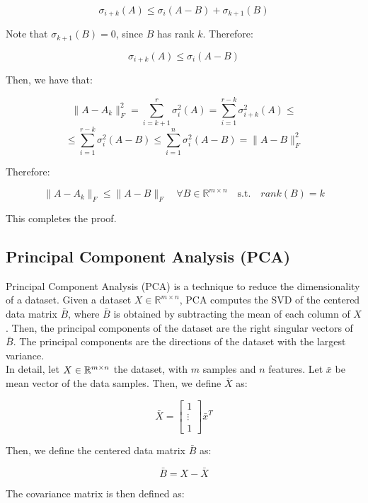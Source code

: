 $$\sigma_{i + k}(A) \leq \sigma_i(A - B) + \sigma_{k + 1}(B)$$

Note that $\sigma_{k+1}(B) = 0$, since $B$ has rank $k$. Therefore:

$$\sigma_{i + k}(A) \leq \sigma_i(A - B)$$

Then, we have that:

$$\|A - A_k\|_F^2 = \sum_{i=k+1}^r \sigma_i^2(A) = \sum_{i=1}^{r - k} \sigma_{i+k}^2(A) \leq$$
$$\leq \sum_{i=1}^{r - k} \sigma_i^2(A - B) \leq \sum_{i=1}^n \sigma_i^2(A - B) = \|A - B\|_F^2$$

Therefore:

$$\|A - A_k\|_F \leq \|A - B\|_F \quad \forall B \in \mathbb{R}^{m \times n} \quad \text{s.t.} \quad rank(B) = k$$

This completes the proof.

\subsection{Principal Component Analysis (PCA)}

Principal Component Analysis (PCA) is a technique to reduce the dimensionality of a dataset. Given a dataset $X \in \mathbb{R}^{m \times n}$,
PCA computes the SVD of the centered data matrix $\bar{B}$, where $\bar{B}$ is obtained by subtracting the mean of each column of $X$.
Then, the principal components of the dataset are the right singular vectors of $\bar{B}$. The principal components are the directions
of the dataset with the largest variance.\\

In detail, let $X \in \mathbb{R}^{m \times n}$ the dataset, with $m$ samples and $n$ features. Let $\bar{x}$ be mean vector of the data samples.
Then, we define $\bar{X}$ as:

\begin{equation}
    \bar{X} = \begin{bmatrix}
        1 \\
        \vdots \\
        1
    \end{bmatrix} \bar{x}^T
\end{equation}

Then, we define the centered data matrix $\bar{B}$ as:

\begin{equation}
    \bar{B} = X - \bar{X}
\end{equation}

The covariance matrix is then defined as:

